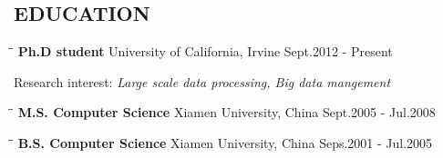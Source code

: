 \documentclass{res}
\begin{document}
\begin{resume}
\section{EDUCATION}          
   \vspace{-0.1in}	
   \begin{tabbing}
  \hspace{2in}\= \hspace{3in}\= \kill %
    {\bf Ph.D student} \>  University of California, Irvine    \>Sept.2012 - Present\\
   \end{tabbing}\vspace{-30pt}      %
   Research interest:\emph{ Large scale data processing, Big data mangement}
   \vspace{-0.1in}	
   \begin{tabbing}
   \hspace{2in}\= \hspace{3in}\= \kill %
    {\bf M.S. Computer Science} \>Xiamen University, China     \>Sept.2005 - Jul.2008\\
   \end{tabbing}\vspace{-30pt}      %
   \vspace{-0.1in}	
   \begin{tabbing}
   \hspace{2in}\= \hspace{3in}\= \kill %
    {\bf B.S. Computer Science} \>Xiamen University, China     \>Seps.2001 - Jul.2005\\
   \end{tabbing}\vspace{-30pt}      %
 

\end{resume}
\end{document}
